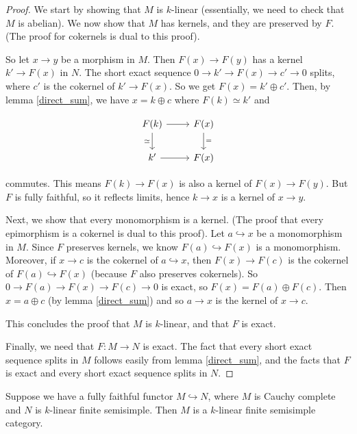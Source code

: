 \begin{proof}
  We start by showing that $M$ is $k$-linear (essentially, we need to check
  that $M$ is abelian). We now show that $M$ has kernels, and they are
  preserved by $F$. (The proof for cokernels is dual to this proof).

  So let $x\to y$ be a morphism in $M$. Then $F(x)\to F(y)$ has a kernel
  $k'\to F(x)$ in $N$. The short exact sequence $0\to k'\to F(x)\to c'\to 0$
  splits, where $c'$ is the cokernel of $k'\to F(x)$. So we get $F(x)=k'\oplus
  c'$. Then, by lemma \ref{direct_sum}, we have $x=k\oplus c$ where
  $F(k)\simeq k'$ and

  \[
    \begin{tikzcd}
      {F(k)} & {F(x)} \\
      {k'} & {F(x)} \arrow[from=1-1, to=1-2]
      \arrow["\simeq"', from=1-1, to=2-1]
      \arrow["{=}", from=1-2, to=2-2]
      \arrow[from=2-1, to=2-2]
    \end{tikzcd}
  \]

  commutes. This means $F(k)\to F(x)$ is also a kernel of $F(x)\to F(y)$. But
  $F$ is fully faithful, so it reflects limits, hence $k\to x$ is a kernel of
  $x\to y$.

  Next, we show that every monomorphism is a kernel. (The proof that every
  epimorphism is a cokernel is dual to this proof). Let $a\hookrightarrow x$
  be a monomorphism in $M$. Since $F$ preserves kernels, we know
  $F(a)\hookrightarrow F(x)$ is a monomorphism. Moreover, if $x\to c$ is the
  cokernel of $a\hookrightarrow x$, then $F(x)\to F(c)$ is the cokernel of
  $F(a)\hookrightarrow F(x)$ (because $F$ also preserves cokernels). So $0\to
  F(a)\to F(x)\to F(c)\to 0$ is exact, so $F(x)=F(a)\oplus F(c)$. Then
  $x=a\oplus c$ (by lemma \ref{direct_sum}) and so $a\to x$ is the kernel of
  $x\to c$.

  This concludes the proof that $M$ is $k$-linear, and that $F$ is exact.

  Finally, we need that $F:M \to N$ is exact. The fact that every short exact
  sequence splits in $M$ follows easily from lemma \ref{direct_sum}, and the
  facts that $F$ is exact and every short exact sequence splits in $N$.
\end{proof}

\begin{proposition}\label{cau_semi}

  \noindent Suppose we have a fully faithful functor $M\hookrightarrow N$,
  where $M$ is Cauchy complete and $N$ is $k$-linear finite semisimple. Then
  $M$ is a $k$-linear finite semisimple category.
\end{proposition}

